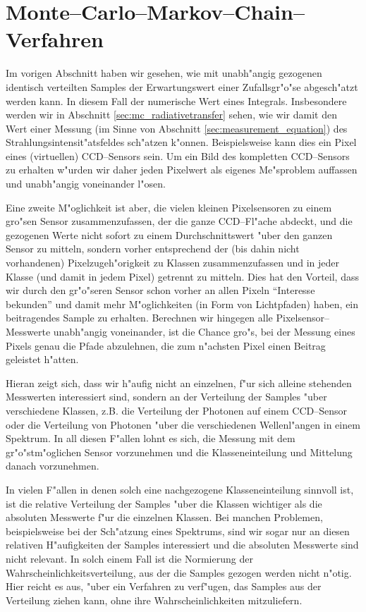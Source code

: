 	\chapter{Monte--Carlo--Markov--Chain--Verfahren}\label{chapter:mcmc}
	Im vorigen Abschnitt haben wir gesehen, wie mit unabh"angig gezogenen identisch verteilten Samples der Erwartungswert einer Zufallsgr"o"se abgesch"atzt werden kann. In diesem Fall der numerische Wert eines Integrals. Insbesondere werden wir in Abschnitt \ref{sec:mc_radiativetransfer} sehen, wie wir damit den Wert einer Messung (im Sinne von Abschnitt \ref{sec:measurement_equation}) des Strahlungsintensit"atsfeldes sch"atzen k"onnen. Beispielsweise kann dies ein Pixel eines (virtuellen) CCD--Sensors sein. Um ein Bild des kompletten CCD--Sensors zu erhalten w"urden wir daher jeden Pixelwert als eigenes Me"sproblem auffassen und unabh"angig voneinander l"osen.
	
	Eine zweite M"oglichkeit ist aber, die vielen kleinen Pixelsensoren zu einem gro"sen Sensor zusammenzufassen, der die ganze CCD--Fl"ache abdeckt, und die gezogenen Werte nicht sofort zu einem Durchschnittswert "uber den ganzen Sensor zu mitteln, sondern vorher entsprechend der (bis dahin nicht vorhandenen) Pixelzugeh"origkeit zu Klassen zusammenzufassen und in jeder Klasse (und damit in jedem Pixel) getrennt zu mitteln. Dies hat den Vorteil, dass wir durch den gr"o"seren Sensor schon vorher an allen Pixeln ``Interesse bekunden'' und damit mehr M"oglichkeiten (in Form von Lichtpfaden) haben, ein beitragendes Sample zu erhalten. Berechnen wir hingegen alle Pixelsensor--Messwerte unabh"angig voneinander, ist die Chance gro"s, bei der Messung eines Pixels genau die Pfade abzulehnen, die zum n"achsten Pixel einen Beitrag geleistet h"atten.
	
	Hieran zeigt sich, dass wir h"aufig nicht an einzelnen, f"ur sich alleine stehenden Messwerten interessiert sind, sondern an der Verteilung der Samples "uber verschiedene Klassen, z.B. die Verteilung der Photonen auf einem CCD--Sensor oder die Verteilung von Photonen "uber die verschiedenen Wellenl"angen in einem Spektrum. In all diesen F"allen lohnt es sich, die Messung mit dem gr"o"stm"oglichen Sensor vorzunehmen und die Klasseneinteilung und Mittelung danach vorzunehmen.

	In vielen F"allen in denen solch eine nachgezogene Klasseneinteilung sinnvoll ist, ist die relative Verteilung der Samples "uber die Klassen wichtiger als die absoluten Messwerte f"ur die einzelnen Klassen. Bei manchen Problemen, beispielsweise bei der Sch"atzung eines Spektrums, sind wir sogar nur an diesen relativen H"aufigkeiten der Samples interessiert und die absoluten Messwerte sind nicht relevant. In solch einem Fall ist die Normierung der Wahrscheinlichkeitsverteilung, aus der die Samples gezogen werden nicht n"otig. Hier reicht es aus, "uber ein Verfahren zu verf"ugen, das Samples aus der Verteilung ziehen kann, ohne ihre Wahrscheinlichkeiten mitzuliefern.
	
